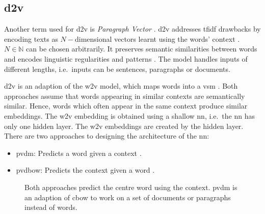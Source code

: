 \subsection{\acl*{d2v}}\label{subsec:doc2vec}

Another term used for \ac{d2v} is \textit{Paragraph Vector} \cite{clusteringDocs2020, SentRep2014}.
\ac{d2v} addresses \ac{tfidf} drawbacks by encoding texts as $N-$dimensional vectors learnt using the words' context \cite{clusteringDocs2020}.
$N \in \mathbb{N}$ can be chosen arbitrarily.
It preserves semantic similarities between words and encodes linguistic regularities and patterns \cite{SkipGram2013}.
The model handles inputs of different lengths, i.e.\ inputs can be sentences, paragraphs or documents.

\ac{d2v} is an adaption of the \ac{w2v} model, which maps words into a \ac{vsm} \cite{clusteringDocs2020}.
Both approaches assume that words appearing in similar contexts are semantically similar. %
Hence, words which often appear in the same context produce similar embeddings.
The \ac{w2v} embedding is obtained using a shallow \ac{nn}, i.e.\ the \ac{nn} has only one hidden layer.
The \ac{w2v} embeddings are created by the hidden layer.
There are two approaches to designing the architecture of the \ac{nn}:
\begin{itemize}
    \item \ac{pvdm}: 
        Predicts a word given a context \cite{SentRep2014, WordRep2013}.
    \item \ac{pvdbow}: 
        Predicts the context given a word \cite{EmbDist2015, SkipGram2013, SentRep2014}.
\end{itemize}


\begin{figure}%
    \centering
    \qquad
    \caption[\ac{cbow} and \ac{pvdm} architecture]{Both approaches predict the centre word using the context.
    \ac{pvdm} is an adaption of \ac{cbow} to work on a set of documents or paragraphs instead of words.
    }%
    \label{fig:pvdm}%
\end{figure}
 
